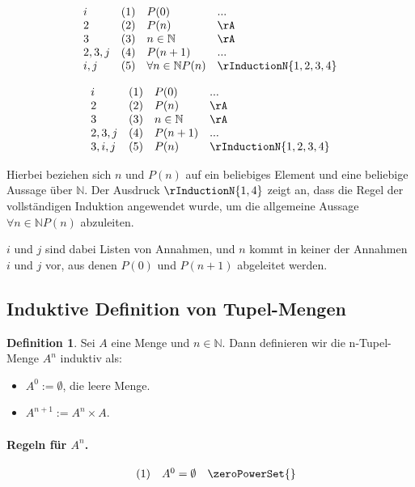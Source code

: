 \documentclass{book}
\theoremstyle{plain}
\theoremstyle{remark}
\theoremstyle{definition}
\newtheorem{definition}{Definition}[section]
\begin{document}
\[
\begin{array}{llll}
    i & (1) & P(0) & ... \\
    2 & (2) & P(n) & \rA \\
    3 & (3) & n \in \mathbb{N} & \rA \\
    2,3,j & (4) & P(n+1) & ... \\
    i,j & (5) & \forall n \in \mathbb{N} P(n) & \rInductionN{1,2,3,4}
\end{array}
\]

\[
\begin{array}{llll}
    i & (1) & P(0) & ... \\
    2 & (2) & P(n) & \rA \\
    3 & (3) & n \in \mathbb{N} & \rA \\
    2,3,j & (4) & P(n+1) & ... \\
    3,i,j & (5) & P(n) & \rInductionN{1,2,3,4}
\end{array}
\]

Hierbei beziehen sich \(n\) und \(P(n)\) auf ein beliebiges Element und eine beliebige Aussage über \(\mathbb{N}\). Der Ausdruck \(\rInductionN{1,4}\) zeigt an, dass die Regel der vollständigen Induktion angewendet wurde, um die allgemeine Aussage \(\forall n \in \mathbb{N} P(n)\) abzuleiten.

\(i\) und \(j\) sind dabei Listen von Annahmen, und \(n\) kommt in keiner der Annahmen \(i\) und \(j\) vor, aus denen \(P(0)\) und \(P(n+1)\) abgeleitet werden.






\subsection{Induktive Definition von Tupel-Mengen}

\begin{definition}
Sei $A$ eine Menge und $n \in \mathbb{N}$. Dann definieren wir die n-Tupel-Menge $A^n$ induktiv als:
\begin{itemize}
    \item $A^0 := \emptyset$, die leere Menge.
    \item $A^{n+1} := A^n \times A$.
\end{itemize}
\end{definition}

\paragraph{Regeln für \( A^n \).}
\label{rule:zeroPowerSet} \label{rule:nextPowerSet}
\[
\begin{array}{llll}
	& (1) & A^0=\emptyset & \zeroPowerSet{} \\
\end{array}
\]
\end{document}
